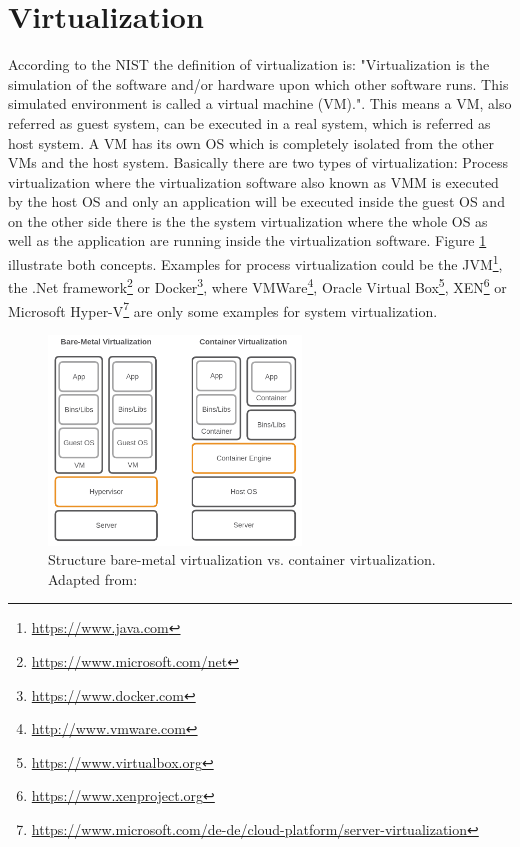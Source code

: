 \section{Virtualization}
\label{section:state_virtualization}
According to the \ac{NIST} the definition of virtualization is: "Virtualization is the simulation of the software and/or hardware upon which other software runs. This simulated environment is called a virtual machine (VM)."\autocite[p. ES-1]{Sca:2011}.
This means a \ac{VM}, also referred as guest system, can be executed in a real system, which is referred as host system.
A \ac{VM} has its own \ac{OS} which is completely isolated from the other \acp{VM} and the host system.\autocite[cf.][p. 2]{Celesti:2016}
Basically there are two types of virtualization: Process virtualization where the virtualization software also known as \ac{VMM} is executed by the host \ac{OS} and only an application will be executed inside the guest \ac{OS} and on the other side there is the the system virtualization where the whole \ac{OS} as well as the application are running inside the virtualization software.
Figure \ref{fig:vms_vs_docker} illustrate both concepts.
Examples for process virtualization could be the \ac{JVM}\footnote{\url{https://www.java.com}}, the .Net framework\footnote{\url{https://www.microsoft.com/net}} or Docker\footnote{\url{https://www.docker.com}}, where VMWare\footnote{\url{http://www.vmware.com}}, Oracle Virtual Box\footnote{\url{https://www.virtualbox.org}}, XEN\footnote{\url{https://www.xenproject.org}} or Microsoft Hyper-V\footnote{\url{https://www.microsoft.com/de-de/cloud-platform/server-virtualization}} are only some examples for system virtualization.

\begin{figure}[H]
    \centering
    \includegraphics[width=0.6\textwidth]{resources/images/vm_vs_container.png}
    \caption[Structure bare-metal virtualization vs. container virtualization]{Structure bare-metal virtualization vs. container virtualization. Adapted from: \autocite[p. 2]{Gallagher:2015}}
    \label{fig:vms_vs_docker}
\end{figure}

